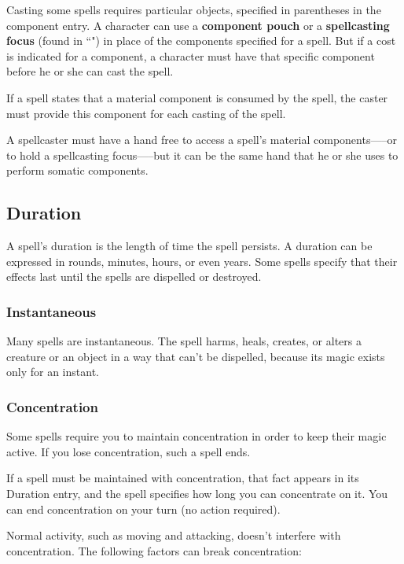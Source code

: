Casting some spells requires particular objects, specified in parentheses in the component entry. A character can use a \textbf{component pouch} or a \textbf{spellcasting focus} (found in “") in place of the components specified for a spell. But if a cost is indicated for a component, a character must have that specific component before he or she can cast the spell.

If a spell states that a material component is consumed by the spell, the caster must provide this component for each casting of the spell.

A spellcaster must have a hand free to access a spell's material components—--or to hold a spellcasting focus—--but it can be the same hand that he or she uses to perform somatic components.

\subsection{Duration}

A spell's duration is the length of time the spell persists. A duration can be expressed in rounds, minutes, hours, or even years. Some spells specify that their effects last until the spells are dispelled or destroyed.

\subsubsection{Instantaneous}

Many spells are instantaneous. The spell harms, heals, creates, or alters a creature or an object in a way that can't be dispelled, because its magic exists only for an instant.

\subsubsection{Concentration}

Some spells require you to maintain concentration in order to keep their magic active. If you lose concentration, such a spell ends.

If a spell must be maintained with concentration, that fact appears in its Duration entry, and the spell specifies how long you can concentrate on it. You can end concentration on your turn (no action required).

Normal activity, such as moving and attacking, doesn't interfere with concentration. The following factors can break concentration:

